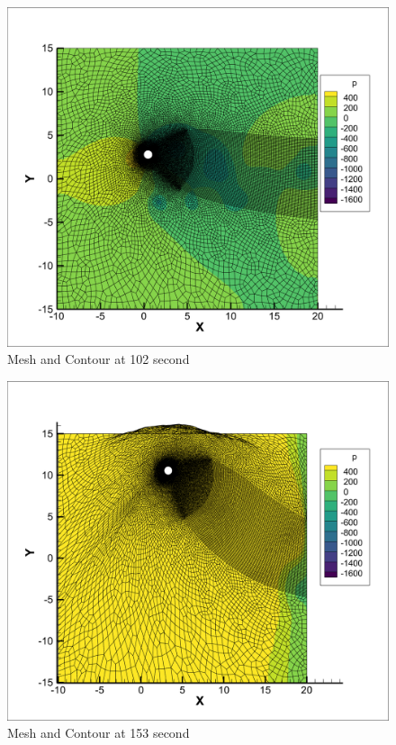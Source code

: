 \documentclass[a4paper,12pt]{article} %
\begin{document}
\begin{figure}[htbp]
    \center
    \includegraphics[scale=0.3]{102.png}
    \caption{Mesh and Contour at 102 second}
\end{figure}
\begin{figure}[htbp]
    \center
    \includegraphics[scale=0.3]{153.png}
    \caption{Mesh and Contour at 153 second}
\end{figure}
\end{document}
